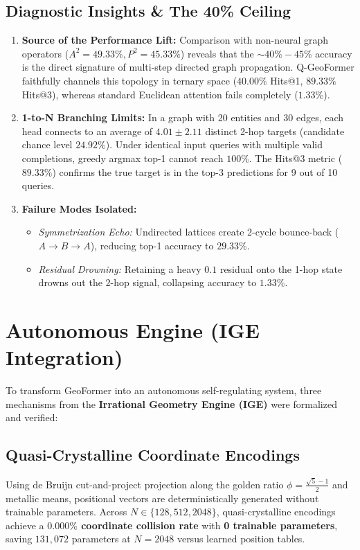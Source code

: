 \documentclass[11pt,a4paper]{article}
\begin{document}
\subsection{Diagnostic Insights \& The 40\% Ceiling}
\begin{enumerate}[leftmargin=1.5em]
    \item \textbf{Source of the Performance Lift:} Comparison with non-neural graph operators ($A^2=49.33\%, P^2=45.33\%$) reveals that the $\sim 40\%-45\%$ accuracy is the direct signature of multi-step directed graph propagation. Q-GeoFormer faithfully channels this topology in ternary space ($40.00\%$ Hits@1, $89.33\%$ Hits@3), whereas standard Euclidean attention fails completely ($1.33\%$).
    \item \textbf{1-to-N Branching Limits:} In a graph with 20 entities and 30 edges, each head connects to an average of $4.01 \pm 2.11$ distinct 2-hop targets (candidate chance level $24.92\%$). Under identical input queries with multiple valid completions, greedy argmax top-1 cannot reach $100\%$. The Hits@3 metric ($89.33\%$) confirms the true target is in the top-3 predictions for 9 out of 10 queries.
    \item \textbf{Failure Modes Isolated:}
    \begin{itemize}
        \item \textit{Symmetrization Echo:} Undirected lattices create 2-cycle bounce-back ($A \to B \to A$), reducing top-1 accuracy to $29.33\%$.
        \item \textit{Residual Drowning:} Retaining a heavy $0.1$ residual onto the 1-hop state drowns out the 2-hop signal, collapsing accuracy to $1.33\%$.
    \end{itemize}
\end{enumerate}

\section{Autonomous Engine (IGE Integration)}

To transform GeoFormer into an autonomous self-regulating system, three mechanisms from the \textbf{Irrational Geometry Engine (IGE)} were formalized and verified:

\subsection{Quasi-Crystalline Coordinate Encodings}
Using de Bruijn cut-and-project projection along the golden ratio $\phi = \frac{\sqrt{5}-1}{2}$ and metallic means, positional vectors are deterministically generated without trainable parameters. Across $N \in \{128, 512, 2048\}$, quasi-crystalline encodings achieve a \textbf{$0.000\%$ coordinate collision rate} with \textbf{0 trainable parameters}, saving $131,072$ parameters at $N=2048$ versus learned position tables.
\end{document}
